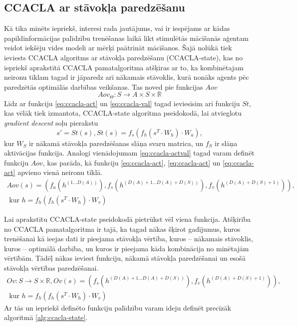 \documentclass{ludis} %
\begin{document}
\subsection{CCACLA ar stāvokļa paredzēšanu}
Kā tika minēts iepriekš, interesi rada jautājums, vai ir iespējams ar kādas
papildinformācijas palīdzību trenēšanas laikā likt stimulētās mācīšanās aģentam
veidot iekšēju vides modeli ar mērķi paātrināt mācīšanos. Šajā nolūkā tiek
ieviests CCACLA algoritms ar stāvokļa paredzēšanu (CCACLA-state), kas no iepriekš aprakstītā
CCACLA pamatalgoritma atšķiras ar to, ka kombinētajam neironu tīklam tagad ir
jāparedz arī nākamais stāvoklis, kurā nonāks aģents pēc paredzētās optimālās
darbības veikšanas. Tas noved pie funkcijas $Aov$ 
\begin{equation}
  Aov_\Theta:S \rightarrow A \times S \times \mathbb{R}
\end{equation}
Līdz ar funkciju \ref{eq:ccacla-act} un \ref{eq:ccacla-val} tagad ieviesīsim arī
funkciju $St$, kas vēlāk tiek izmantota, CCACLA-state algoritma pseidokodā, lai
atvieglotu \textit{gradient descent} soļu pierakstu
\begin{equation}\label{eq:ccacla-obs}
  s' = St(s), St(s) = f_s(f_h(s^T \cdot W_h) \cdot W_a),
\end{equation} 
kur $W_S$ ir nākamā stāvokļa paredzēšanas slāņa svaru matrica, un $f_S$ ir
slāņa aktivācijas funkcija.
Analogi vienādojumam \ref{eq:ccacla-actval} tagad varam definēt funkciju $Aov$,
kas parāda, kā funkciju \ref{eq:ccacla-act}, \ref{eq:ccacla-act} un
\ref{eq:ccacla-act} apvieno vienā neironu tīklā.
\begin{multline}\label{eq:ccacla-actobsval}
  Aov(s) = \left(f_a(h^{(1 \ldots D(A))}),
                 f_s(h^{(D(A) + 1 \ldots D(A) + D(S))}),
                 f_v(h^{(D(A) + D(S) + 1)})\right), \\
  \text{ kur } h = f_h\left(f_h(s^T \cdot W_h) \cdot W_v\right)
\end{multline}

Lai aprakstītu CCACLA-state pseidokodā pietrūkst vēl viena funkcija. Atšķirība no
CCACLA pamatalgoritma ir tajā, ka tagad nākas šķirot gadījumus, kuros
trenēšanai kā ieejas dati ir pieejama stāvokļa vērtība, kuros -- nākamais
stāvoklis, kuros -- optimālā darbība, un kuros ir pieejama kāda kombinācija no
minētajām vērtībām. Tādēļ nākas ieviest funkciju, nākamā stāvokļa paredzēšanai
un esošā stāvokļa vērtības paredzēšanai.
\begin{multline}\label{eq:ccacla-obsval}
  Ov: S \rightarrow S \times \mathbb{R},
        Ov(s) = \left(f_s(h^{(D(A) + 1 \ldots D(A) + D(S))}),
                 f_v(h^{(D(A) + D(S) + 1)})\right), \\
  \text{ kur } h = f_h\left(f_h(s^T \cdot W_h) \cdot W_v\right)
\end{multline}
Ar tās un iepriekš definēto funkciju palīdzību varam ideju definēt precīzāk
algoritmā \ref{alg:ccacla-state}.
\end{document}
